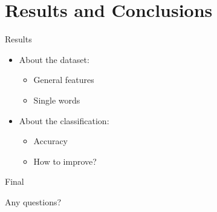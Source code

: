 \documentclass[xcolor=x11names,compress]{beamer}
\renewcommand{\(}{\begin{columns}}
\renewcommand{\)}{\end{columns}}
\newcommand{\<}[1]{\begin{column}{#1}}
\renewcommand{\>}{\end{column}}
\begin{document}
\section{Results and Conclusions}
\begin{frame}{Results}
  \begin{itemize}
    \item<1->About the dataset:
      \begin{itemize}
        \item<2->General features
        \item<3->Single words
      \end{itemize}
    \item<4->About the classification:
      \begin{itemize}
        \item<5->Accuracy
        \item<6->How to improve?
      \end{itemize}
  \end{itemize}
\end{frame}

\begin{frame}{Final}
  \begin{center}
    Any questions?
  \end{center}
\end{frame}
\end{document}

